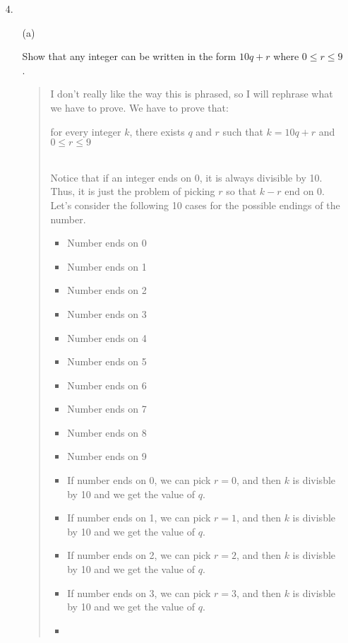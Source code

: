 \documentclass[12pt, a4paper]{article}                      %
\begin{document}
\begin{itemize}
\item[4.]
\begin{itemize}
\item[(a)]
\item[]
Show that any integer can be written in the form $10q + r$ where $0 \leq r \leq 9$.
\begin{quote}
I don't really like the way this is phrased, so I will rephrase what we have to prove.
We have to prove that:\\
\begin{center}
for every integer $k$, there exists $q$ and $r$ such that $k = 10q + r$ and $0 \leq r \leq 9$\\\
\end{center}
Notice that if an integer ends on 0, it is always divisible by 10. Thus, it is just the problem
of picking $r$ so that $k - r$ end on 0.\\
Let's consider the following 10 cases for the possible endings of the number.
\begin{itemize}
\item
Number ends on 0
\item
Number ends on 1
\item
Number ends on 2
\item
Number ends on 3
\item
Number ends on 4
\item
Number ends on 5
\item
Number ends on 6
\item
Number ends on 7
\item
Number ends on 8
\item
Number ends on 9
\\
\end{itemize}
\begin{itemize}
\item
If number ends on 0, we can pick $r = 0$, and then $k$ is divisble by 10 and we get the value of $q$.\\
\item
If number ends on 1, we can pick $r = 1$, and then $k$ is divisble by 10 and we get the value of $q$.\\
\item
If number ends on 2, we can pick $r = 2$, and then $k$ is divisble by 10 and we get the value of $q$.\\
\item
If number ends on 3, we can pick $r = 3$, and then $k$ is divisble by 10 and we get the value of $q$.\\
\item

\end{itemize}
\end{quote}
\end{itemize}
\end{itemize}
\end{document}
